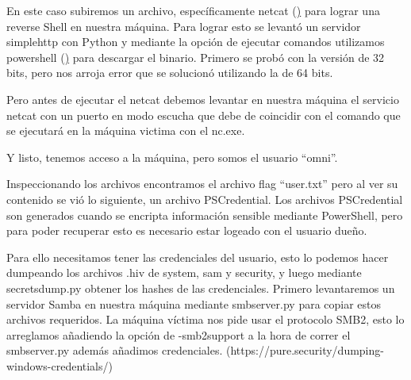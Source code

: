 \documentclass{article}
\begin{document}
En este caso subiremos un archivo, específicamente netcat (\href{https://github.com/int0x33/nc.exe/}) para lograr una reverse Shell en nuestra máquina.
Para lograr esto se levantó un servidor simplehttp con Python y mediante la opción de ejecutar comandos utilizamos powershell (\href{https://academy.hackthebox.com/course/preview/file-transfers/windows-file-transfer-methods}) para descargar el binario.
Primero se probó con la versión de 32 bits, pero nos arroja error que se solucionó utilizando la de 64 bits.
\begin{figure}[H]
	\center
	\caption{}
\end{figure}

Pero antes de ejecutar el netcat debemos levantar en nuestra máquina el servicio netcat con un puerto en modo escucha que debe de coincidir con el comando que se ejecutará en la máquina victima con el nc.exe.
\begin{figure}[H]
	\center
	\caption{}
\end{figure}
\begin{figure}[H]
	\center
	\caption{}
\end{figure}

Y listo, tenemos acceso a la máquina, pero somos el usuario “omni”.
\begin{figure}[H]
	\center
	\caption{}
\end{figure}

Inspeccionando los archivos encontramos el archivo flag “user.txt” pero al ver su contenido se vió lo siguiente, un archivo PSCredential. Los archivos PSCredential son generados cuando se encripta información sensible mediante PowerShell, pero para poder recuperar esto es necesario estar logeado con el usuario dueño.
\begin{figure}[H]
	\center
	\caption{}
\end{figure}

Para ello necesitamos tener las credenciales del usuario, esto lo podemos hacer dumpeando los archivos .hiv de system, sam y security, y luego mediante secretsdump.py obtener los hashes de las credenciales.
Primero levantaremos un servidor Samba en nuestra máquina mediante smbserver.py para copiar estos archivos requeridos. La máquina víctima nos pide usar el protocolo SMB2, esto lo arreglamos añadiendo la opción de -smb2support a la hora de correr el smbserver.py además añadimos credenciales. (https://pure.security/dumping-windows-credentials/)
\begin{figure}[H]
	\center
	\caption{}
\end{figure}
\begin{figure}[H]
	\center
	\caption{}
\end{figure}
\end{document}
